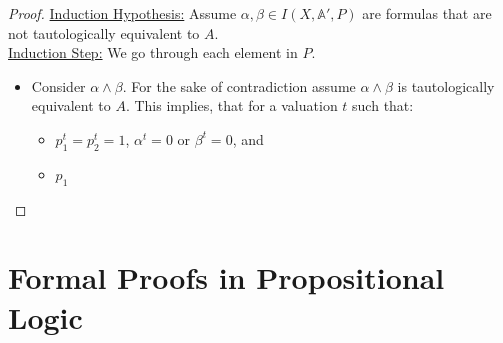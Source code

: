 \documentclass[12pt]{article}
\begin{document}
\begin{enumerate}
\begin{tasks}
\begin{proof}
                \underline{Induction Hypothesis:} Assume $\alpha,\beta\in I(X,\mathbb{A}', P)$ are formulas that are not tautologically equivalent to $A$.\\
                \underline{Induction Step:} We go through each element in $P$.
                \begin{itemize}
                    \item Consider $\alpha\land\beta$. For the sake of contradiction assume $\alpha\land\beta$ is tautologically equivalent to $A$. This implies, that for a valuation $t$ such that:
                    \begin{itemize}
                        \item $p_1^t=p_2^t=1$, $\alpha^t=0$ or $\beta^t=0$, and
                        \item $p_1$
                    \end{itemize}
                \end{itemize}
            \end{proof}
        \end{tasks}
    \end{enumerate}

    \section{Formal Proofs in Propositional Logic}
\end{document}
